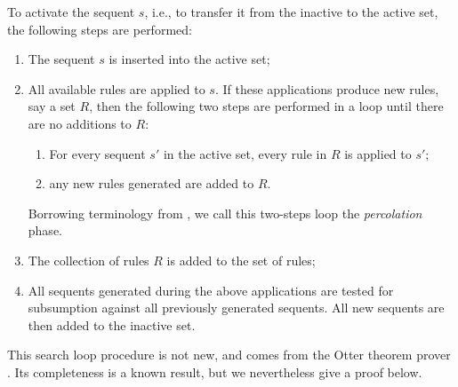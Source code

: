 \begin{definition}[Activation]
  To activate the sequent $s$, i.e., to transfer it from the inactive to the
  active set, the following steps are performed:

  \begin{enumerate}
  \item The sequent $s$ is inserted into the active set;
  \item All available rules are applied to $s$. If these applications produce
    new rules, say a set $R$, then the following two steps are performed in a
    loop until there are no additions to $R$:

    \begin{enumerate}
    \item For every sequent $s'$ in the active set, every rule in $R$ is applied
      to $s'$;
    \item any new rules generated are added to $R$.
    \end{enumerate}

    Borrowing terminology from \cite{chaudhuri-thesis}, we call this two-steps
    loop the \emph{percolation} phase.
  \item The collection of rules $R$ is added to the set of rules;
  \item All sequents generated during the above applications are tested for
    subsumption against all previously generated sequents. All new
    sequents are then added to the inactive set.
  \end{enumerate}
\end{definition}

This search loop procedure is not new, and comes from the Otter theorem prover
\cite{otter}. Its completeness is a known result, but we nevertheless give a
proof below.

